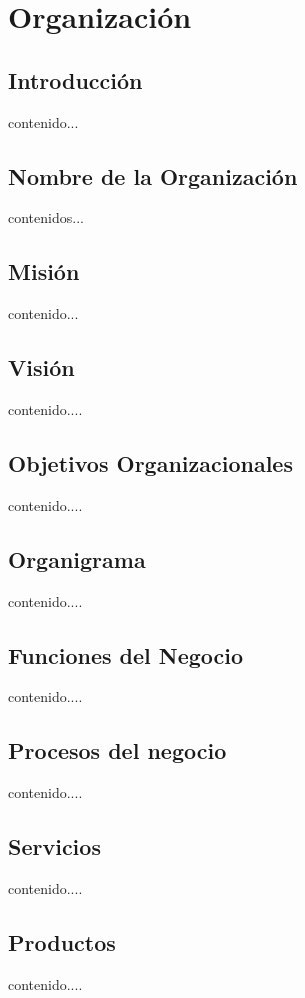\chapter{Organización}
\section{Introducción}
contenido...
\newpage
\section{Nombre de la Organización}
contenidos...
\section{Misión}
contenido...
\section{Visión}
contenido....
\section{Objetivos Organizacionales}
contenido....
\newpage
\section{Organigrama}
contenido....
\newpage
\section{Funciones del Negocio}
contenido....
\newpage
\section{Procesos del negocio}
contenido....
\newpage
\section{Servicios}
contenido....
\newpage
\section{Productos}
contenido....
\newpage